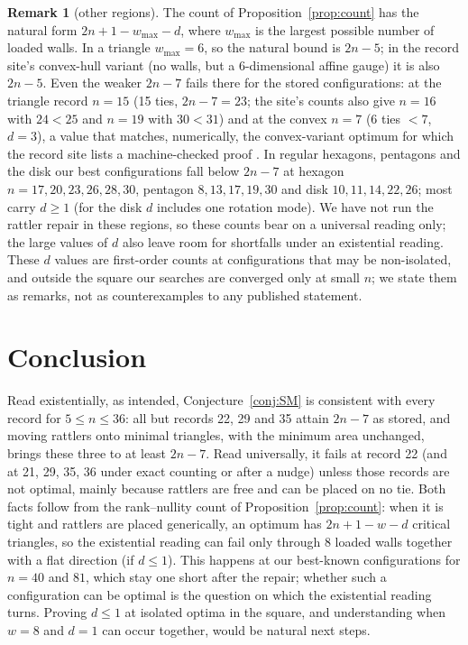 \documentclass[11pt]{amsart}
\theoremstyle{definition}
\newtheorem{remark}[theorem]{Remark}
\begin{document}
\begin{remark}[other regions]\label{rem:regions}
The count of Proposition~\ref{prop:count} has the natural form $2n + 1 - w_{\max} - d$, where $w_{\max}$ is the largest possible number of loaded walls. In a triangle $w_{\max} = 6$, so the natural bound is $2n-5$; in the record site's convex-hull variant (no walls, but a 6-dimensional affine gauge) it is also $2n-5$. %
Even the weaker $2n-7$ fails there for the stored configurations: at the triangle record $n = 15$ (15 ties, $2n-7 = 23$; the site's counts also give $n = 16$ with $24 < 25$ and $n = 19$ with $30 < 31$) and at the convex $n = 7$ (6 ties $< 7$, $d = 3$), a value that matches, numerically, the convex-variant optimum for which the record site lists a machine-checked proof \cite{Stead}. In regular hexagons, pentagons and the disk our best configurations fall below $2n-7$ at hexagon $n = 17, 20, 23, 26, 28, 30$, pentagon $8, 13, 17, 19, 30$ and disk $10, 11, 14, 22, 26$; most carry $d \ge 1$ (for the disk $d$ includes one rotation mode). We have not run the rattler repair in these regions, so these counts bear on a universal reading only; the large values of $d$ also leave room for shortfalls under an existential reading. These $d$ values are first-order counts at configurations that may be non-isolated, and outside the square our searches are converged only at small $n$; we state them as remarks, not as counterexamples to any published statement. %
\end{remark}

\section{Conclusion}
Read existentially, as intended, Conjecture~\ref{conj:SM} is consistent with every record for $5 \le n \le 36$: all but records 22, 29 and 35 attain $2n-7$ as stored, and moving rattlers onto minimal triangles, with the minimum area unchanged, brings these three to at least $2n-7$. Read universally, it fails at record 22 (and at 21, 29, 35, 36 under exact counting or after a nudge) unless those records are not optimal, mainly because rattlers are free and can be placed on no tie. Both facts follow from the rank--nullity count of Proposition~\ref{prop:count}: when it is tight and rattlers are placed generically, an optimum has $2n + 1 - w - d$ critical triangles, so the existential reading can fail only through 8 loaded walls together with a flat direction (if $d \le 1$). This happens at our best-known configurations for $n = 40$ and $81$, which stay one short after the repair; whether such a configuration can be optimal is the question on which the existential reading turns. Proving $d \le 1$ at isolated optima in the square, and understanding when $w = 8$ and $d = 1$ can occur together, would be natural next steps.
\end{document}
